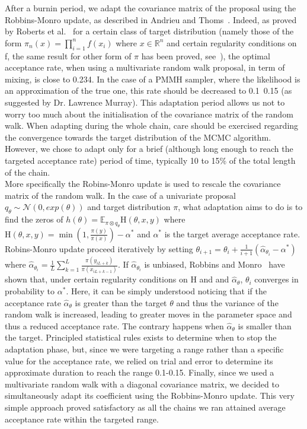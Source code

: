 \documentclass{article}
\begin{document}
	After a burnin period, we adapt the covariance matrix of the proposal using the Robbins-Monro update, as described in Andrieu and Thoms~\cite{Andrieu2008}. Indeed, as proved by Roberts et al.~\cite{roberts1997weak} for a certain class of target distribution (namely those of the form $\pi_n(x) = \prod_{i=1}^{n}f(x_i)$ where $x \in \mathbb{R}^n$ and certain regularity conditions on f, the same result for other form of $\pi$ has been proved, see~\cite{roberts2001optimal}), the optimal acceptance rate, when using a multivariate random walk proposal, in term of mixing, is close to 0.234. In the case of a PMMH sampler, where the likelihood is an approximation of the true one, this rate should be decreased to 0.1~0.15 (as suggested by Dr. Lawrence Murray). This adaptation period allows us not to worry too much about the initialisation of the covariance matrix of the random walk. When adapting during the whole chain, care should be exercised regarding the convergence towards the target distribution of the MCMC algorithm. However, we chose to adapt only for a brief (although long enough to reach the targeted acceptance rate) period of time, typically 10 to 15\% of the total length of the chain.\\
	
	More specifically the Robins-Monro update is used to rescale the covariance matrix of the random walk. In the case of a univariate proposal $q_\theta \sim \mathcal{N}(0, exp(\theta))$ and target distribution $\pi$,  what adaptation aims to do is to find the zeros of $h(\theta) = \mathbb{E}_{\pi\otimes q_\theta}\mathrm{H}(\theta, x, y)$ where $\mathrm{H}(\theta, x, y) = \min(1, \frac{\pi(y)}{\pi(x)}) - \alpha^*$ and $\alpha^*$ is the target average acceptance rate. Robins-Monro update proceed iteratively by setting $\theta_{i+1} = \theta_i + \frac{1}{i+1}(\hat{\alpha}_{\theta_i} - \alpha^*)$ where $\hat{\alpha}_{\theta_i} = \frac{1}{L}\sum_{k=1}^{L}\frac{\pi(y_{iL+k})}{\pi(x_{iL+k-1})}$. If $\hat{\alpha}_{\theta_i}$ is unbiased, Robbins and Monro~\cite{robbins1951stochastic} have shown that, under certain regularity conditions on H and and $\hat{\alpha}_\theta$, $\theta_i$ converges in probability to $\alpha^*$. Here, it can be simply understood noticing that if the acceptance rate $\hat{\alpha}_\theta$ is greater than the target $\theta$ and thus the variance of the random walk is increased, leading to greater moves in the parameter space and thus a reduced acceptance rate. The contrary happens when $\hat{\alpha}_\theta$ is smaller than the target. Principled statistical rules exists to determine when to stop the adaptation phase, but, since we were targeting a range rather than a specific value for the acceptance rate,  we relied on trial and error to determine its approximate duration to reach the range 0.1-0.15. Finally, since we used a multivariate random walk with a diagonal covariance matrix, we decided to simultaneously adapt its coefficient using the Robbins-Monro update. This very simple approach proved satisfactory as all the chains we ran attained average acceptance rate within the targeted range.
	
\end{document}
